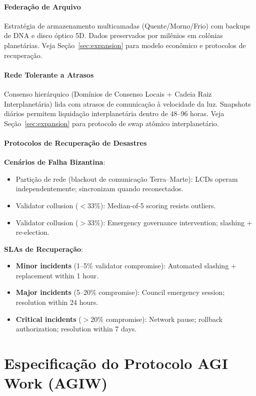 \documentclass[11pt]{article}
\begin{document}
\begin{itemize}[noitemsep]
\begin{itemize}[noitemsep]
\begin{itemize}[noitemsep]
\paragraph{Federação de Arquivo}
Estratégia de armazenamento multicamadas (Quente/Morno/Frio) com backups de DNA e disco óptico 5D. Dados preservados por milênios em colônias planetárias. Veja Seção~\ref{sec:expansion} para modelo econômico e protocolos de recuperação.

\paragraph{Rede Tolerante a Atrasos}
Consenso hierárquico (Domínios de Consenso Locais + Cadeia Raiz Interplanetária) lida com atrasos de comunicação à velocidade da luz. Snapshots diários permitem liquidação interplanetária dentro de 48--96 horas. Veja Seção~\ref{sec:expansion} para protocolo de swap atômico interplanetário.

\paragraph{Protocolos de Recuperação de Desastres}
\textbf{Cenários de Falha Bizantina}:
\begin{itemize}[noitemsep]
  \item Partição de rede (blackout de comunicação Terra--Marte): LCDs operam independentemente; sincronizam quando reconectados.
  \item Validator collusion ($<$33\%): Median-of-5 scoring resists outliers.
  \item Validator collusion ($>$33\%): Emergency governance intervention; slashing + re-election.
\end{itemize}

\textbf{SLAs de Recuperação}:
\begin{itemize}[noitemsep]
  \item \textbf{Minor incidents} (1--5\% validator compromise): Automated slashing + replacement within 1 hour.
  \item \textbf{Major incidents} (5--20\% compromise): Council emergency session; resolution within 24 hours.
  \item \textbf{Critical incidents} ($>$20\% compromise): Network pause; rollback authorization; resolution within 7 days.
\end{itemize}

\section{Especificação do Protocolo AGI Work (AGIW)}
\label{sec:agiw-spec}


\end{itemize}
\end{itemize}
\end{itemize}
\end{document}
